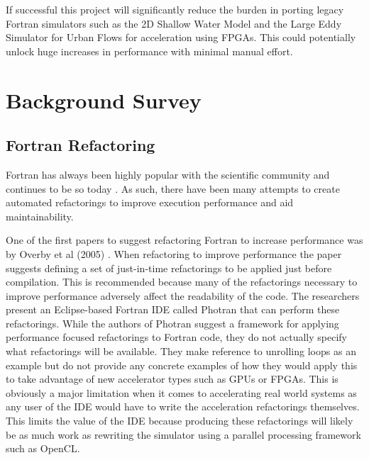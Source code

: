 \documentclass{mpaper}
\begin{document}
If successful this project will significantly reduce the burden in porting legacy Fortran simulators such as the 2D Shallow Water Model \cite{Hall2009} and the Large Eddy Simulator for Urban Flows \cite{Nakayama2011} for acceleration using FPGAs. This could potentially unlock huge increases in performance with minimal manual effort.


\section{Background Survey}

\subsection{Fortran Refactoring}

Fortran has always been highly popular with the scientific community and continues to be so today  \cite{VanderbauwhedeDavidson2018}. As such, there have been many attempts to create automated refactorings to improve execution performance and aid maintainability.

One of the first papers to suggest refactoring Fortran to increase performance was by Overby et al (2005) \cite{Overbey2005}. When refactoring to improve performance the paper suggests defining a set of just-in-time refactorings to be applied just before compilation. This is recommended because many of the refactorings necessary to improve performance adversely affect the readability of the code. The researchers present an Eclipse-based Fortran IDE called Photran that can perform these refactorings. While the authors of Photran suggest a framework for applying performance focused refactorings to Fortran code, they do not actually specify what refactorings will be available. They make reference to unrolling loops as an example but do not provide any concrete examples of how they would apply this to take advantage of new accelerator types such as GPUs or FPGAs. This is obviously a major limitation when it comes to accelerating real world systems as any user of the IDE would have to write the acceleration refactorings themselves. This limits the value of the IDE because producing these refactorings will likely be as much work as rewriting the simulator using a parallel processing framework such as OpenCL.
\end{document}
